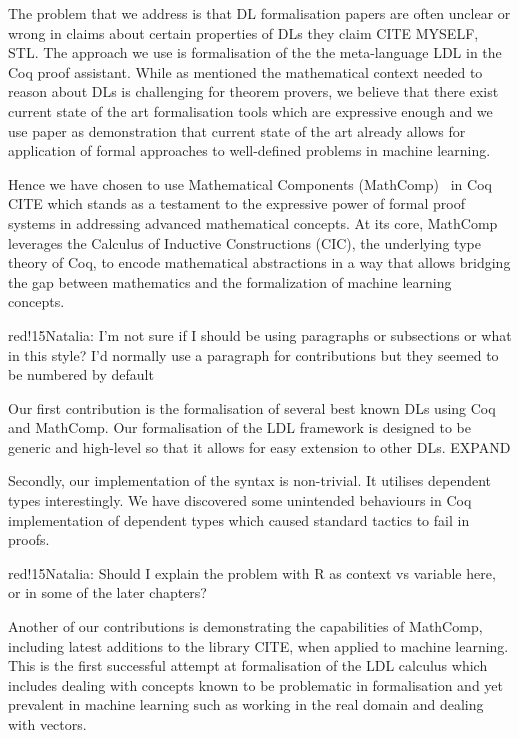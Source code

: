 \documentclass[a4paper,UKenglish,cleveref, autoref, thm-restate]{lipics-v2021}
\newcommand{\natalia}[1]{\begin{authorComment}{red!15}Natalia: #1\end{authorComment}}
\begin{document}
The problem that we address is that DL formalisation papers are often unclear or wrong in claims about certain properties of DLs they claim CITE MYSELF, STL. The approach we use is formalisation of the the meta-language LDL in the Coq proof assistant. While as mentioned the mathematical context needed to reason about DLs is challenging for theorem provers, we believe that there exist current state of the art formalisation tools which are expressive enough and we use paper as demonstration that current state of the art already allows for application of formal approaches to well-defined problems in machine learning. 

Hence we have chosen to use Mathematical Components (MathComp)~\cite{mathcomp} in Coq CITE which stands as a testament to the expressive power of formal proof systems in addressing advanced mathematical concepts. At its core, MathComp leverages the Calculus of Inductive Constructions (CIC), the underlying type theory of Coq, to encode mathematical abstractions in a way that allows bridging the gap between mathematics and the formalization of machine learning concepts. 

\natalia{I'm not sure if I should be using paragraphs or subsections or what in this style? I'd normally use a paragraph for contributions but they seemed to be numbered by default}

Our first contribution is the formalisation of several best known DLs using Coq and MathComp. Our formalisation of the LDL framework is designed to be generic and high-level so that it allows for easy extension to other DLs. EXPAND

Secondly, our implementation of the syntax is non-trivial. It utilises dependent types interestingly. We have discovered some unintended behaviours in Coq implementation of dependent types which caused standard tactics to fail in proofs. \natalia{Should I explain the problem with R as context vs variable here, or in some of the later chapters?}

Another of our contributions is demonstrating the capabilities of MathComp, including latest additions to the library CITE, when applied to machine learning. This is the first successful attempt at formalisation of the LDL calculus which includes dealing with concepts known to be problematic in formalisation and yet prevalent in machine learning such as working in the real domain and dealing with vectors.
\end{document}
